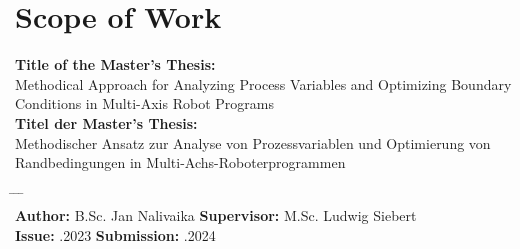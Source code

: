 \chapter*{Scope of Work}


\textbf{Title of the Master's Thesis:}\\
\Large{Methodical Approach for Analyzing Process Variables and Optimizing Boundary Conditions in Multi-Axis Robot Programs}\\
\newline
\normalsize{\textbf{Titel der Master's Thesis:}}\\
\Large{Methodischer Ansatz zur Analyse von Prozessvariablen und Optimierung von Randbedingungen in Multi-Achs-Roboterprogrammen}
\normalsize

\begin{tabbing}
	\hspace{7em} 		\= \hspace{13em}			\= \hspace{7em} 		\= \kill
				\> 						\> \\
	\textbf{Author:} \>B.Sc. Jan Nalivaika	\> \textbf{Supervisor:} 	\>M.Sc. Ludwig Siebert  \\
	\textbf{Issue:} 	.2023	\> \textbf{Submission:} 	.2024
\end{tabbing}

